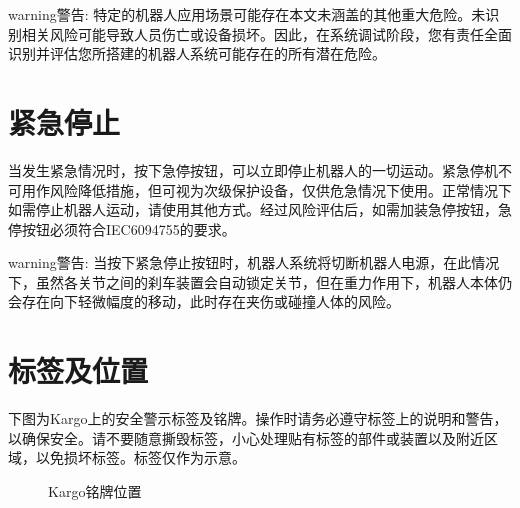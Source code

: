 \documentclass[a4paper,11pt,english,openany,oneside]{sphinxmanual}
\begin{document}
\begin{sphinxadmonition}{warning}{警告:}
\sphinxAtStartPar
特定的机器人应用场景可能存在本文未涵盖的其他重大危险。未识别相关风险可能导致人员伤亡或设备损坏。因此，在系统调试阶段，您有责任全面识别并评估您所搭建的机器人系统可能存在的所有潜在危险。
\end{sphinxadmonition}


\section{紧急停止}
\label{\detokenize{05 _u5b89_u5168_u89c4_u8303:id12}}
\sphinxAtStartPar
当发生紧急情况时，按下急停按钮，可以立即停止机器人的一切运动。紧急停机不可用作风险降低措施，但可视为次级保护设备，仅供危急情况下使用。正常情况下如需停止机器人运动，请使用其他方式。经过风险评估后，如需加装急停按钮，急停按钮必须符合IEC\sphinxhyphen{}60947\sphinxhyphen{}5\sphinxhyphen{}5的要求。

\begin{sphinxadmonition}{warning}{警告:}
\sphinxAtStartPar
当按下紧急停止按钮时，机器人系统将切断机器人电源，在此情况下，虽然各关节之间的刹车装置会⾃动锁定关节，但在重力作用下，机器人本体仍会存在向下轻微幅度的移动，此时存在夹伤或碰撞人体的风险。
\end{sphinxadmonition}


\section{标签及位置}
\label{\detokenize{05 _u5b89_u5168_u89c4_u8303:id13}}\label{\detokenize{05 _u5b89_u5168_u89c4_u8303:id14}}
\sphinxAtStartPar
下图为Kargo上的安全警示标签及铭牌。操作时请务必遵守标签上的说明和警告，以确保安全。请不要随意撕毁标签，小心处理贴有标签的部件或装置以及附近区域，以免损坏标签。标签仅作为示意。

\begin{figure}[H]
\centering
\capstart

\noindent{}
\caption{Kargo铭牌位置}\label{\detokenize{05 _u5b89_u5168_u89c4_u8303:id20}}\end{figure}
\end{document}
